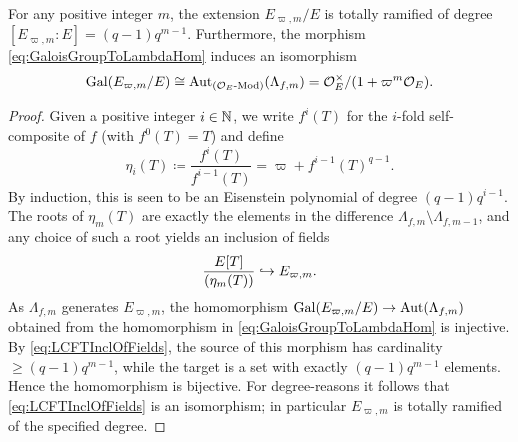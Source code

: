 \documentclass[../main.tex]{subfiles}
\begin{document}
\begin{lem}\label{lem:PropertiesOfFiniteLTExt}
  For any positive integer $m$, the extension $E_{\varpi,m}/E$ is totally ramified
  of degree $[E_{\varpi,m}:E] = (q-1) q^{m-1}$. Furthermore, the morphism
  \eqref{eq:GaloisGroupToLambdaHom} induces an isomorphism
  \begin{equation*}
    \operatorname{Gal}(E_{\varpi, m}/E) \cong \operatorname{Aut}_{{({\mathcal{O}_E}\textnormal-\allowbreak\mathrm{Mod})}}(\Lambda_{f,m}) = 
    \mathcal{O}_E^\times/(1 + \varpi^m \mathcal{O}_E).
  \end{equation*}
\begin{proof}
  Given a positive integer $i \in \mathbb{N}$, we write $f^i(T)$ for the $i$-fold
  self-composite of $f$ (with $f^0(T) = T$) and define
  \begin{equation*}
    \eta_i(T) \coloneq \frac{f^i(T)}{f^{i-1}(T)} = \varpi + f^{i-1}(T)^{q-1}.
  \end{equation*}
  By induction, this is seen to be an Eisenstein polynomial
  of degree $(q-1) q^{i-1}$. The roots of $\eta_m(T)$ are exactly the elements
  in the difference $\Lambda_{f,m} \setminus \Lambda_{f,m-1}$, and any choice of such
  a root yields an inclusion of fields
  \begin{equation}\label{eq:LCFTInclOfFields}
    \frac{E[T]}{(\eta_m(T))} \hookrightarrow E_{\varpi,m}.
  \end{equation}
  As $\Lambda_{f,m}$ generates $E_{\varpi, m}$, the homomorphism
  $\operatorname{Gal}(E_{\varpi,m}/E) \to \operatorname{Aut}(\Lambda_{f,m})$ obtained from the 
  homomorphism in \eqref{eq:GaloisGroupToLambdaHom} is injective. 
  By \eqref{eq:LCFTInclOfFields}, the source of this morphism has cardinality
  $\geq (q-1)q^{m-1}$, while the target is a set with exactly $(q-1)q^{m-1}$
  elements. Hence the homomorphism is bijective. For degree-reasons it follows that
  \eqref{eq:LCFTInclOfFields}
  is an isomorphism; in particular $E_{\varpi,m}$ is totally ramified of
  the specified degree.
\end{proof}
\end{lem}
\end{document}
